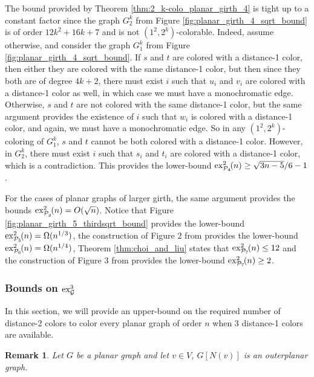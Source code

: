 \documentclass{article}
\newtheorem{remark}[theorem]{Remark}
\newcommand{\colo}[2]{(1^{#1}, 2^{#2})}
\newcommand{\ex}[3]{\operatorname{ex}^{#1}_{#2}\hspace{-3pt}{#3}}
\begin{document}
The bound provided by Theorem \ref{thm:2_k-colo_planar_girth_4} is tight up to a constant factor since the graph $G_2^k$ from Figure \ref{fig:planar_girth_4_sqrt_bound} is of order $12k^2 + 16k + 7$ and is not $\colo{2}{k}$-colorable. Indeed, assume otherwise, and consider the graph $G_1^k$ from Figure \ref{fig:planar_girth_4_sqrt_bound}. If $s$ and $t$ are colored with a distance-1 color, then either they are colored with the same distance-1 color, but then since they both are of degree $4k + 2$, there must exist $i$ such that $u_i$ and $v_i$ are colored with a distance-1 color as well, in which case we must have a monochromatic edge. Otherwise, $s$ and $t$ are not colored with the same distance-1 color, but the same argument provides the existence of $i$ such that $w_i$ is colored with a distance-1 color, and again, we must have a monochromatic edge. So in any $\colo{2}{k}$-coloring of $G_1^k$, $s$ and $t$ cannot be both colored with a distance-1 color. However, in $G_2^k$, there must exist $i$ such that $s_i$ and $t_i$ are colored with a distance-1 color, which is a contradiction. This provides the lower-bound $\ex{2}{\mathcal{P}_4}{(n)} \ge \sqrt{3n-5}/6 - 1$. 

For the cases of planar graphs of larger girth, the same argument provides the bounds $\ex{2}{\mathcal{P}_g}{(n)} = O(\sqrt{n})$. Notice that Figure \ref{fig:planar_girth_5_thirdsqrt_bound} provides the lower-bound $\ex{2}{\mathcal{P}_5}{(n)} = \Omega(n^{1/3})$, the construction of Figure $2$ from \cite{choi2025propersquarecoloringssparse} provides the lower-bound $\ex{2}{\mathcal{P}_6}{(n)} = \Omega(n^{1/4})$, Theorem \ref{thm:choi_and_liu} states that $\ex{2}{\mathcal{P}_7}{(n)} \le 12$ and the construction of Figure $3$ from \cite{choi2025propersquarecoloringssparse} provides the lower-bound $\ex{2}{\mathcal{P}_7}{(n)} \ge 2$.

\subsubsection{Bounds on $\ex{3}{\mathcal{G}}{}$}

In this section, we will provide an upper-bound on the required number of distance-2 colors to color every planar graph of order $n$ when $3$ distance-1 colors are available. 




\begin{remark}
    Let $G$ be a planar graph and let $v \in V$, $G[N(v)]$ is an outerplanar graph.
\end{remark}
\end{document}
